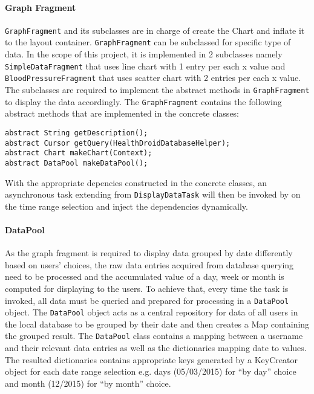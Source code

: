 \paragraph{Graph Fragment}
\texttt{GraphFragment} and its subclasses are in charge of create the Chart and inflate it to the layout container.
\texttt{GraphFragment} can be subclassed for specific type of data. In the scope of this project, it is implemented in 2
subclasses namely \texttt{SimpleDataFragment} that uses line chart with 1 entry per each x value and
\texttt{BloodPressureFragment} that uses scatter chart with 2 entries per each x value. The subclasses are required to
implement the abstract methods in \texttt{GraphFragment} to display the data accordingly.
The \texttt{GraphFragment} contains the following abstract methods that are implemented in the concrete classes:
\begin{lstlisting}
abstract String getDescription();
abstract Cursor getQuery(HealthDroidDatabaseHelper);
abstract Chart makeChart(Context);
abstract DataPool makeDataPool();
\end{lstlisting}
With the appropriate depencies constructed in the concrete classes, an asynchronous task extending from
\texttt{DisplayDataTask} will then be invoked by on the time range selection and inject the dependencies dynamically.

\paragraph{DataPool}
As the graph fragment is required to display data grouped by date differently based on users' choices, the raw data
entries acquired from database querying need to be processed and the accumulated value of a day, week or month is
computed for displaying to the users. To achieve that, every time the task is invoked, all data must be queried and
prepared for processing in a \texttt{DataPool} object. The \texttt{DataPool} object acts as a central repository for
data of all users in the local database to be grouped by their date and then creates a Map containing the grouped
result. The \texttt{DataPool} class contains a mapping between a username and their relevant data entries as well as the
dictionaries mapping date to values. The resulted dictionaries contains appropriate keys generated by a KeyCreator
object for each date range selection e.g. days (05/03/2015) for ``by day'' choice and month (12/2015) for ``by month''
choice.

